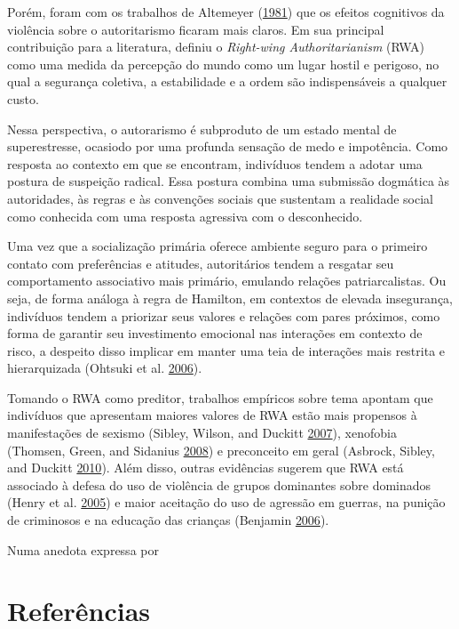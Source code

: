 \documentclass[12 pt,]{article}
\begin{document}
Porém, foram com os trabalhos de Altemeyer
(\protect\hyperlink{ref-altemeyer1981right}{1981}) que os efeitos
cognitivos da violência sobre o autoritarismo ficaram mais claros. Em
sua principal contribuição para a literatura, definiu o \emph{Right-wing
Authoritarianism} (RWA) como uma medida da percepção do mundo como um
lugar hostil e perigoso, no qual a segurança coletiva, a estabilidade e
a ordem são indispensáveis a qualquer custo.

Nessa perspectiva, o autorarismo é subproduto de um estado mental de
superestresse, ocasiodo por uma profunda sensação de medo e impotência.
Como resposta ao contexto em que se encontram, indivíduos tendem a
adotar uma postura de suspeição radical. Essa postura combina uma
submissão dogmática às autoridades, às regras e às convenções sociais
que sustentam a realidade social como conhecida com uma resposta
agressiva com o desconhecido.

Uma vez que a socialização primária oferece ambiente seguro para o
primeiro contato com preferências e atitudes, autoritários tendem a
resgatar seu comportamento associativo mais primário, emulando relações
patriarcalistas. Ou seja, de forma análoga à regra de Hamilton, em
contextos de elevada insegurança, indivíduos tendem a priorizar seus
valores e relações com pares próximos, como forma de garantir seu
investimento emocional nas interações em contexto de risco, a despeito
disso implicar em manter uma teia de interações mais restrita e
hierarquizada (Ohtsuki et al.
\protect\hyperlink{ref-ohtsuki2006cooperation}{2006}).

Tomando o RWA como preditor, trabalhos empíricos sobre tema apontam que
indivíduos que apresentam maiores valores de RWA estão mais propensos à
manifestações de sexismo (Sibley, Wilson, and Duckitt
\protect\hyperlink{ref-sibley2007antecedents}{2007}), xenofobia
(Thomsen, Green, and Sidanius
\protect\hyperlink{ref-thomsen2008we}{2008}) e preconceito em geral
(Asbrock, Sibley, and Duckitt
\protect\hyperlink{ref-asbrock2010right}{2010}). Além disso, outras
evidências sugerem que RWA está associado à defesa do uso de violência
de grupos dominantes sobre dominados (Henry et al.
\protect\hyperlink{ref-henry2005social}{2005}) e maior aceitação do uso
de agressão em guerras, na punição de criminosos e na educação das
crianças (Benjamin
\protect\hyperlink{ref-benjamin2006relationship}{2006}).

Numa anedota expressa por

\newpage

\hypertarget{referencias}{%
\section*{Referências}\label{referencias}}
\end{document}
